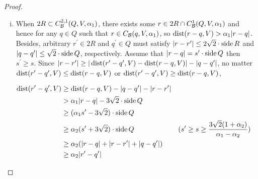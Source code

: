 \begin{proof}
    \begin{enumerate}[(i)]
        \item When {\color{red}$2R\subset C_\mathcal B^{2,1}(Q, V, \alpha_1)$}, there exists some $r\in 2R\cap C_\mathcal B^1(Q, V, \alpha_1)$ and hence {\color{red} for any} $q\in Q$ such that $r\in C_\mathcal B(q, V, \alpha_1)$, so $\operatorname{dist}(r-q, V)>\alpha_1|r-q|$. Besides, {\color{red}arbitrary} $r^\prime\in 2R$ and $q^\prime\in Q$ must satisfy $|r-r^\prime|\leq 2\sqrt{2}\cdot\operatorname{side} R$ and $|q-q^\prime|\leq \sqrt{2}\cdot\operatorname{side} Q$, respectively. Assume that $|r-q| = s^\prime\cdot\operatorname{side} Q$ then $s^\prime \geq s$. Since $ |r-r^\prime| \geq|\operatorname{dist} (r^\prime-q^\prime, V)-\operatorname{dist}(r-q, V)| - |q-q^\prime|$, no matter $\operatorname{dist} (r^\prime-q^\prime, V)\leq \operatorname{dist}(r-q, V)$ or $\operatorname{dist} (r^\prime-q^\prime, V)\geq \operatorname{dist}(r-q, V)$,

        \begin{align*}
            \operatorname{dist}(r^\prime-q^\prime, V) &\geq \operatorname{dist}(r-q, V)-|q-q^\prime|-|r-r^\prime| \\
            &> \alpha_1|r-q| - 3\sqrt{2} \cdot\operatorname{side} Q\\
            &\geq (\alpha_1 s^\prime- 3\sqrt{2})\cdot\operatorname{side} Q\\
            &\geq \alpha_2(s^\prime+3\sqrt{2})\cdot\operatorname{side} Q  &&(s^\prime \geq s \geq \frac{3\sqrt{2}(1+\alpha_2)}{\alpha_1-\alpha_2}) \\
            &\geq \alpha_2(|r-q|+|r-r^\prime|+|q-q^\prime|)\\
            &\geq \alpha_2|r^\prime-q^\prime|
        \end{align*}


\end{enumerate}
\end{proof}
